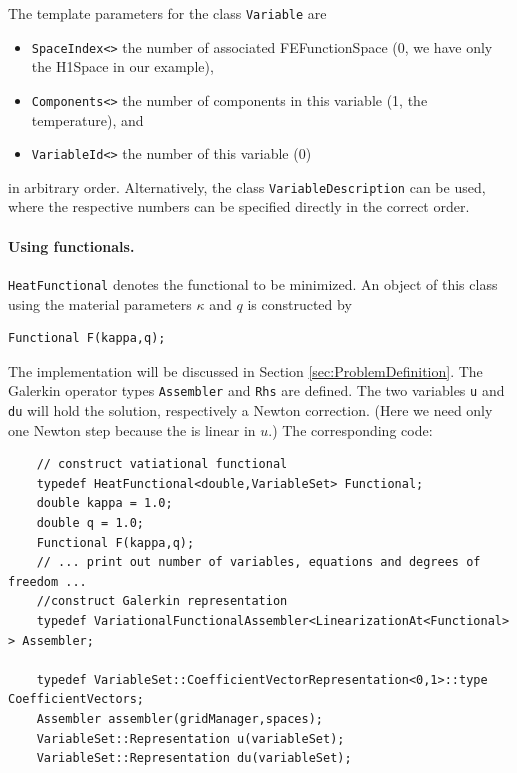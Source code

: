 \documentclass[11pt]{article}
\begin{document}
The template parameters for the class {\tt Variable} are
\begin{itemize}
\item \verb?SpaceIndex<>? the number of associated FEFunctionSpace (0, we have only the H1Space in our example),\vspace*{-2mm}
\item \verb?Components<>? the number of components in this variable (1, the temperature), and\vspace*{-2mm}
\item \verb?VariableId<>? the number of this variable (0)
\end{itemize}
in arbitrary order. Alternatively, the class {\tt VariableDescription} can be used, where the respective numbers can be specified directly in the correct order.

\paragraph{Using functionals.}

{\tt HeatFunctional} denotes the functional to be minimized. An object of this class using the material
parameters $\kappa$ and $q$ is constructed by

\begin{lstlisting}
Functional F(kappa,q);
\end{lstlisting}

\noindent The implementation will be discussed in 
Section \ref{sec:ProblemDefinition}. The Galerkin operator types {\tt Assembler} and {\tt Rhs} are defined. 
The two variables {\tt u} and {\tt du} will hold the solution, respectively a Newton correction. 
(Here we need only one Newton step because the  is linear in $u$.) The corresponding code:\\

\begin{lstlisting}
	// construct vatiational functional
	typedef HeatFunctional<double,VariableSet> Functional;
	double kappa = 1.0;
	double q = 1.0;
	Functional F(kappa,q);
	// ... print out number of variables, equations and degrees of freedom ...
	//construct Galerkin representation
	typedef VariationalFunctionalAssembler<LinearizationAt<Functional> > Assembler;
	
	typedef VariableSet::CoefficientVectorRepresentation<0,1>::type CoefficientVectors;
	Assembler assembler(gridManager,spaces);
	VariableSet::Representation u(variableSet);
	VariableSet::Representation du(variableSet);
\end{lstlisting}
\end{document}
